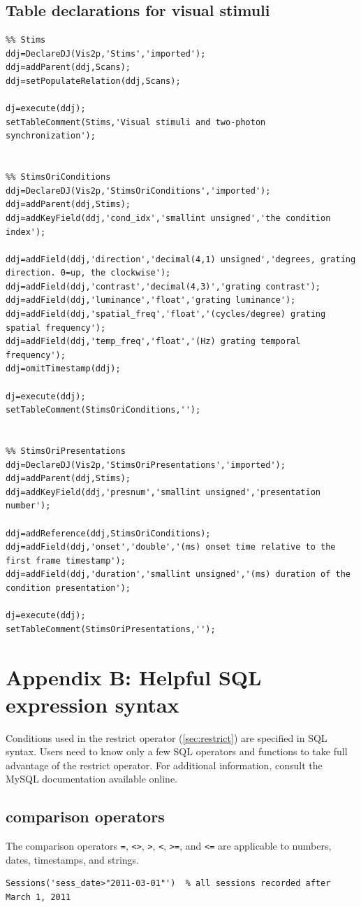 \documentclass[10pt]{article}
\begin{document}
\subsection{Table declarations for visual stimuli}\label{sec:stims}
\begin{lstlisting}
%% Stims
ddj=DeclareDJ(Vis2p,'Stims','imported');
ddj=addParent(ddj,Scans);
ddj=setPopulateRelation(ddj,Scans);

dj=execute(ddj);
setTableComment(Stims,'Visual stimuli and two-photon synchronization');


%% StimsOriConditions
ddj=DeclareDJ(Vis2p,'StimsOriConditions','imported');
ddj=addParent(ddj,Stims);
ddj=addKeyField(ddj,'cond_idx','smallint unsigned','the condition index');

ddj=addField(ddj,'direction','decimal(4,1) unsigned','degrees, grating direction. 0=up, the clockwise');
ddj=addField(ddj,'contrast','decimal(4,3)','grating contrast');
ddj=addField(ddj,'luminance','float','grating luminance');
ddj=addField(ddj,'spatial_freq','float','(cycles/degree) grating spatial frequency');
ddj=addField(ddj,'temp_freq','float','(Hz) grating temporal frequency');
ddj=omitTimestamp(ddj);

dj=execute(ddj);
setTableComment(StimsOriConditions,'');


%% StimsOriPresentations
ddj=DeclareDJ(Vis2p,'StimsOriPresentations','imported');
ddj=addParent(ddj,Stims);
ddj=addKeyField(ddj,'presnum','smallint unsigned','presentation number');

ddj=addReference(ddj,StimsOriConditions);
ddj=addField(ddj,'onset','double','(ms) onset time relative to the first frame timestamp');
ddj=addField(ddj,'duration','smallint unsigned','(ms) duration of the condition presentation');

dj=execute(ddj);
setTableComment(StimsOriPresentations,'');
\end{lstlisting}

\newpage\section{Appendix B: Helpful SQL expression syntax}\label{sec:sql}
Conditions used in the restrict operator (\autoref{sec:restrict}) are specified in SQL syntax. Users need to know only a few SQL operators and functions to take full advantage of the restrict operator.  For additional information, consult the MySQL documentation available online. 
\subsection{comparison operators}
The comparison operators {\tt =}, {\tt <>}, {\tt >}, {\tt <}, {\tt >=}, and {\tt <=} are applicable to numbers, dates, timestamps, and strings. 
\begin{lstlisting}
Sessions('sess_date>"2011-03-01"')  % all sessions recorded after March 1, 2011
\end{lstlisting}
\end{document}
